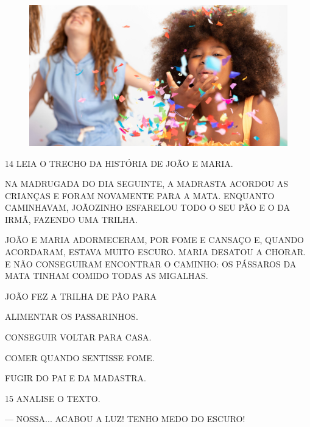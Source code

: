 \begin{figure}[H]
\centering
\includegraphics[width=.9\textwidth]{media/image270.png}
\end{figure}

\num{14} LEIA O TRECHO DA HISTÓRIA DE JOÃO E MARIA.

\begin{myquote}
NA MADRUGADA DO DIA SEGUINTE, A MADRASTA ACORDOU AS CRIANÇAS E FORAM
NOVAMENTE PARA A MATA. ENQUANTO CAMINHAVAM, JOÃOZINHO ESFARELOU TODO O
SEU PÃO E O DA IRMÃ, FAZENDO UMA TRILHA.

JOÃO E MARIA
ADORMECERAM, POR FOME E CANSAÇO E, QUANDO ACORDARAM, ESTAVA MUITO
ESCURO. MARIA DESATOU A CHORAR. E NÃO CONSEGUIRAM
ENCONTRAR O CAMINHO: OS PÁSSAROS DA MATA TINHAM COMIDO TODAS AS
MIGALHAS.

\end{myquote}

JOÃO FEZ A TRILHA DE PÃO PARA

\begin{escolha}[itemsep=-5pt]
\item ALIMENTAR OS PASSARINHOS.

\item CONSEGUIR VOLTAR PARA CASA.

\item COMER QUANDO SENTISSE FOME.

\item FUGIR DO PAI E DA MADASTRA.
\end{escolha}

\num{15} ANALISE O TEXTO.

\begin{myquote}
--- NOSSA... ACABOU A LUZ! TENHO MEDO DO ESCURO!
\end{myquote}

